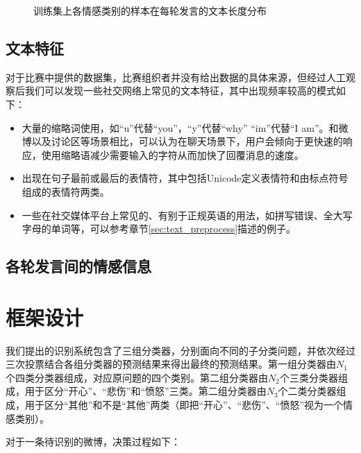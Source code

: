 \begin{figure}[h]
  \caption{训练集上各情感类别的样本在每轮发言的文本长度分布}

  \label{fig:context_emo_train_class_len}
\end{figure}

\subsection{文本特征}
\label{ssec:exp_context_emo_data_text}

对于比赛中提供的数据集，比赛组织者并没有给出数据的具体来源，但经过人工观察后我们可以发现一些社交网络上常见的文本特征，其中出现频率较高的模式如下：

\begin{itemize}

\item 大量的缩略词使用，如“u”代替“you”，“y”代替“why” “im”代替“I am”。和微博以及讨论区等场景相比，可以认为在聊天场景下，用户会倾向于更快速的响应，使用缩略语减少需要输入的字符从而加快了回覆消息的速度。

\item 出现在句子最前或最后的表情符，其中包括Unicode定义表情符和由标点符号组成的表情符两类。

\item 一些在社交媒体平台上常见的、有别于正规英语的用法，如拼写错误、全大写字母的单词等，可以参考章节\ref{sec:text_preprocess}描述的例子。

\end{itemize}

\subsection{各轮发言间的情感信息}



\section{框架设计}
\label{sec:exp_context_emo_framework}

我们提出的识别系统包含了三组分类器，分别面向不同的子分类问题，并依次经过三次投票结合各组分类器的预测结果来得出最终的预测结果。第一组分类器由$N_1$个四类分类器组成，对应原问题的四个类别。第二组分类器由$N_2$个三类分类器组成，用于区分“开心”、“悲伤”和“愤怒”三类。第二组分类器由$N_3$个二类分类器组成，用于区分“其他”和不是“其他”两类（即把“开心”、“悲伤”、“愤怒”视为一个情感类别）。

对于一条待识别的微博，决策过程如下：

